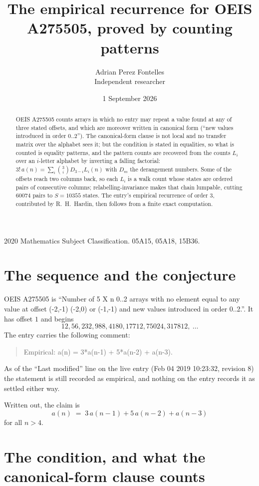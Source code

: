 \documentclass[11pt,a4paper]{article}
\title{The empirical recurrence for OEIS A275505, proved by counting patterns}
\author{Adrian Perez Fontelles\\ \small Independent researcher}
\date{1 September 2026}
\theoremstyle{plain}
\theoremstyle{definition}
\begin{document}
\maketitle

\begin{abstract}
OEIS A275505 counts arrays in which no entry may repeat a value found at any of three stated
offsets, and which are moreover written in canonical form (``new values introduced in order
$0..2$''). The canonical-form clause is not local and no transfer matrix over the
alphabet sees it; but the condition is stated in equalities, so what is counted is equality
patterns, and the pattern counts are recovered from the counts $L_i$ over an $i$-letter
alphabet by inverting a falling factorial:
$3!\,a(n)=\sum_i\binom{3}{i}D_{3-i}L_i(n)$ with $D_m$ the derangement numbers.
Some of the offsets reach two columns back, so each $L_i$ is a walk count whose states are
ordered pairs of consecutive columns; relabelling-invariance makes that chain lumpable,
cutting $60074$ pairs to $S=10355$ states. The entry's empirical recurrence of order $3$,
contributed by R.~H.~Hardin, then follows from a finite exact computation.
\end{abstract}

\noindent\small 2020 Mathematics Subject Classification. 05A15, 05A18, 15B36.\normalsize

\section{The sequence and the conjecture}

OEIS A275505 is ``Number of 5 X n 0..2 arrays with no element equal to any value at offset (-2,-1) (-2,0) or (-1,-1) and new values introduced in order 0..2.''. It has offset $1$ and begins
\[
12, 56, 232, 988, 4180, 17712, 75024, 317812,\ \dots
\]
The entry carries the following comment:
\begin{quote}\small
Empirical: a(n) = 3*a(n-1) + 5*a(n-2) + a(n-3).
\end{quote}
As of the ``Last modified'' line on the live entry (Feb 04 2019 10:23:32, revision 8) the statement is
still recorded as empirical, and nothing on the entry records it as settled either way.

Written out, the claim is
\begin{equation}\label{eq:conj}
a(n)\;=\;3\,a(n-1) + 5\,a(n-2) + a(n-3)
\end{equation}
for all $n>4$.

\section{The condition, and what the canonical-form clause counts}
\end{document}
